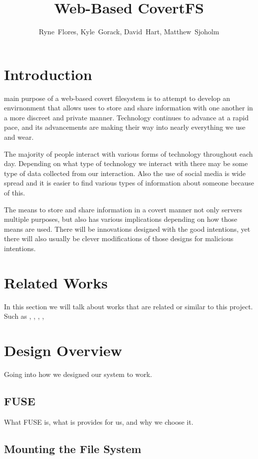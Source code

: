 \documentclass[12pt,journal,compsoc]{IEEEtran}
\title{Web-Based CovertFS}
\author{Ryne~Flores, Kyle~Gorack, David~Hart, Matthew~Sjoholm \\ \IEEEmembership{Department of Electrical Engineering and Computer Science\\ United States Military Academy}}
\date{}
\begin{document}
\maketitle

\section{Introduction}

 main purpose of a web-based covert filesystem is to attempt to develop an envirnonment that allows uses to store and share information with one another in a more discreet and private manner. Technology continues to advance at a rapid pace, and its advancements are making their way into nearly everything we use and wear. 

The majority of people interact with various forms of technology throughout each day. Depending on what type of technology we interact with there may be some type of data collected from our interaction. Also the use of social media is wide spread and it is easier to find various types of information about someone because of this. 

The means to store and share information in a covert manner not only servers multiple purposes, but also has various implications depending on how those means are used. There will be innovations designed with the good intentions, yet there will also usually be clever modifications of those designs for malicious intentions.
\section{Related Works}
In this section we will talk about works that are related or similar to this project. Such as \cite{Andersen1993}, \cite{Guitton2013}, \cite{Johnson2008}, \cite{Morkevicius2013}, \cite{Tan2003}

\section{Design Overview}

Going into how we designed our system to work.

\subsection{FUSE}

What FUSE is, what is provides for us, and why we choose it.

\subsection{Mounting the File System}
\end{document}
